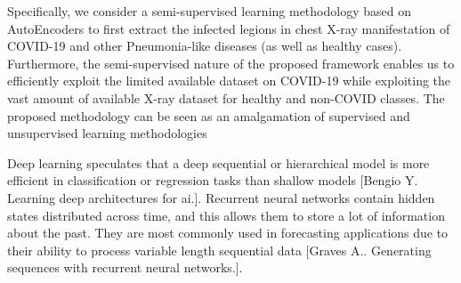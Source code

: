 Specifically, we consider a semi-supervised learning methodology based on AutoEncoders to first extract the infected legions in chest X-ray manifestation of COVID-19 and other Pneumonia-like diseases (as well as healthy cases). 
Furthermore, the semi-supervised nature of the proposed framework enables us to efficiently exploit the limited available dataset on COVID-19 while exploiting the vast amount of available X-ray dataset for healthy and non-COVID classes. 
The proposed methodology can be seen as an amalgamation of supervised and unsupervised learning methodologies


Deep learning speculates that a deep sequential or hierarchical model is more efficient in classification or regression tasks than shallow models [Bengio Y. Learning deep architectures for ai.]. Recurrent neural networks contain hidden states distributed across time, and this allows them to store a lot of information about the past. They are most commonly used in forecasting applications due to their ability to process variable length sequential data [Graves A.. Generating sequences with recurrent neural networks.]. 

